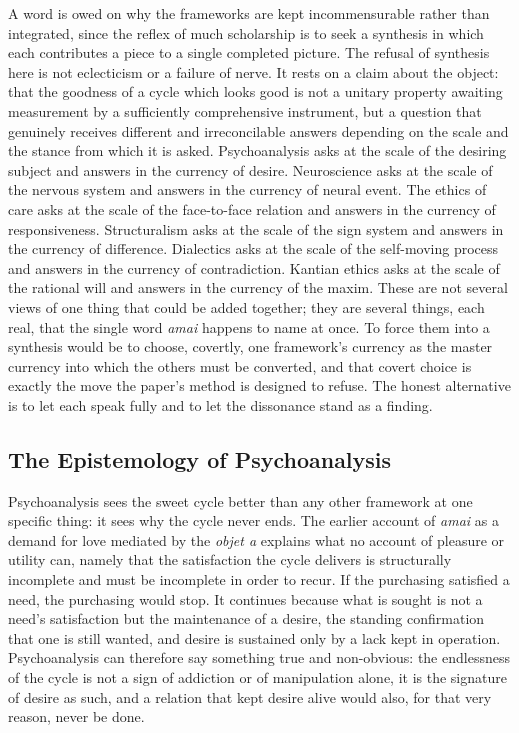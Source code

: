 \documentclass[11pt,a4paper]{article}
\begin{document}
A word is owed on why the frameworks are kept incommensurable rather than integrated, since the reflex of much scholarship is to seek a synthesis in which each contributes a piece to a single completed picture. The refusal of synthesis here is not eclecticism or a failure of nerve. It rests on a claim about the object: that the goodness of a cycle which looks good is not a unitary property awaiting measurement by a sufficiently comprehensive instrument, but a question that genuinely receives different and irreconcilable answers depending on the scale and the stance from which it is asked. Psychoanalysis asks at the scale of the desiring subject and answers in the currency of desire. Neuroscience asks at the scale of the nervous system and answers in the currency of neural event. The ethics of care asks at the scale of the face-to-face relation and answers in the currency of responsiveness. Structuralism asks at the scale of the sign system and answers in the currency of difference. Dialectics asks at the scale of the self-moving process and answers in the currency of contradiction. Kantian ethics asks at the scale of the rational will and answers in the currency of the maxim. These are not several views of one thing that could be added together; they are several things, each real, that the single word \textit{amai} happens to name at once. To force them into a synthesis would be to choose, covertly, one framework's currency as the master currency into which the others must be converted, and that covert choice is exactly the move the paper's method is designed to refuse. The honest alternative is to let each speak fully and to let the dissonance stand as a finding.

\subsection{The Epistemology of Psychoanalysis}

Psychoanalysis sees the sweet cycle better than any other framework at one specific thing: it sees why the cycle never ends. The earlier account of \textit{amai} as a demand for love mediated by the \textit{objet a} explains what no account of pleasure or utility can, namely that the satisfaction the cycle delivers is structurally incomplete and must be incomplete in order to recur. If the purchasing satisfied a need, the purchasing would stop. It continues because what is sought is not a need's satisfaction but the maintenance of a desire, the standing confirmation that one is still wanted, and desire is sustained only by a lack kept in operation. Psychoanalysis can therefore say something true and non-obvious: the endlessness of the cycle is not a sign of addiction or of manipulation alone, it is the signature of desire as such, and a relation that kept desire alive would also, for that very reason, never be done.
\end{document}
